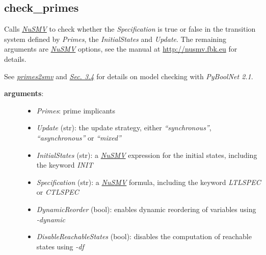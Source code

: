 \documentclass[letterpaper,10pt,english]{sphinxmanual}
\begin{document}
\subsection{check\_primes}
\label{ModelChecking:id2}\label{ModelChecking:check-primes}

\begin{fulllineitems}
\label{ModelChecking:PyBoolNet.ModelChecking.check_primes}
Calls {\hyperref[Installation:installation-nusmv]{\emph{NuSMV}}} to check whether the \emph{Specification} is true or false in the transition system defined by \emph{Primes},
the \emph{InitialStates} and \emph{Update}.
The remaining arguments are {\hyperref[Installation:installation-nusmv]{\emph{NuSMV}}} options, see the manual at \href{http://nusmv.fbk.eu}{http://nusmv.fbk.eu} for details.

See {\hyperref[ModelChecking:primes2smv]{\emph{primes2smv}}} and {\hyperref[Manual:sec-model-checking]{\emph{Sec. 3.4}}} for details on model checking with \emph{PyBoolNet 2.1}.
\begin{description}
\item[{\textbf{arguments}:}] \leavevmode\begin{itemize}
\item {} 
\emph{Primes}: prime implicants

\item {} 
\emph{Update} (str): the update strategy, either \emph{``synchronous''}, \emph{``asynchronous''} or \emph{``mixed''}

\item {} 
\emph{InitialStates} (str): a {\hyperref[Installation:installation-nusmv]{\emph{NuSMV}}} expression for the initial states, including the keyword \emph{INIT}

\item {} 
\emph{Specification} (str): a {\hyperref[Installation:installation-nusmv]{\emph{NuSMV}}} formula, including the keyword \emph{LTLSPEC} or \emph{CTLSPEC}

\item {} 
\emph{DynamicReorder} (bool): enables dynamic reordering of variables using \emph{-dynamic}

\item {} 
\emph{DisableReachableStates} (bool): disables the computation of reachable states using \emph{-df}


\end{itemize}
\end{description}
\end{fulllineitems}
\end{document}
